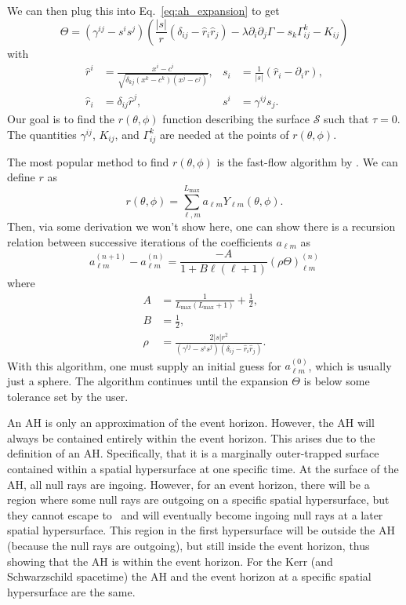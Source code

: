 \begin{bibunit}[unsrtnat]
We can then plug this into Eq.~\ref{eq:ah_expansion} to get
\begin{equation}
   \Theta = (\gamma^{ij}-s^is^j)
   \left(\frac{|s|}{r}(\delta_{ij}-\hat{r}_i\hat{r}_j)
      -\lambda\partial_i\partial_j\Gamma -s_k\Gamma^k_{ij} - K_{ij}\right)
\end{equation}
with
\begin{align}
   \hat{r}^i &= \frac{x^i-c^i}{\sqrt{\delta_{kj}(x^k-c^k)(x^j-c^j)}},
   &s_i &= \frac{1}{|s|}\left(\hat{r}_i-\partial_i r\right), \\
   \hat{r}_i &= \delta_{ij}\hat{r}^j,
   &s^i &= \gamma^{ij}s_j .
\end{align}
Our goal is to find the $r(\theta,\phi)$ function describing the surface
$\mathcal{S}$ such that $\tau = 0$. The quantities $\gamma^{ij}$, $K_{ij}$, and
$\Gamma^k_{ij}$ are needed at the points of $r(\theta,\phi)$.

The most popular method to find $r(\theta,\phi)$ is the fast-flow algorithm by
\cite{Gundlach:1997us}. We can define $r$ as
\begin{equation}
   r(\theta,\phi) = \sum_{\ell,m}^{L_{\mathrm{max}}} a_{\ell m} Y_{\ell m}(\theta,\phi) .
\end{equation}
Then, via some derivation we won't show here, one can show there is a recursion
relation between successive iterations of the coefficients $a_{\ell m}$ as
\begin{equation}
   a_{\ell m}^{(n+1)} - a_{\ell m}^{(n)} = \frac{-A}{1+B\ell(\ell+1)}
   \left(\rho\Theta\right)_{\ell m}^{(n)}
\end{equation}
where
\begin{align}
   A &= \frac{1}{L_{\mathrm{max}}(L_{\mathrm{max}}+1)} + \frac{1}{2}, \\
   B &= \frac{1}{2}, \\
   \rho &= \frac{2|s|r^2}{(\gamma^{ij}-s^is^j)(\delta_{ij}-\hat{r}_i\hat{r}_j)} .
\end{align}
With this algorithm, one must supply an initial guess for $a_{\ell
m}^{(0)}$, which is usually just a sphere. The algorithm continues until the
expansion $\Theta$ is below some tolerance set by the user.

An AH is only an approximation of the event horizon. However, the AH will always
be contained entirely within the event horizon. This arises due to the
definition of an AH. Specifically, that it is a marginally outer-trapped surface
contained within a spatial hypersurface at one specific time. At the surface of
the AH, all null rays are ingoing. However, for an event horizon, there will be
a region where some null rays are outgoing on a specific spatial hypersurface,
but they cannot escape to \scri~and will eventually become ingoing null rays at
a later spatial hypersurface. This region in the first hypersurface will be
outside the AH (because the null rays are outgoing), but still inside the
event horizon, thus showing that the AH is within the event horizon. For the
Kerr (and Schwarzschild spacetime) the AH and the event horizon at a specific
spatial hypersurface are the same.


\end{bibunit}
